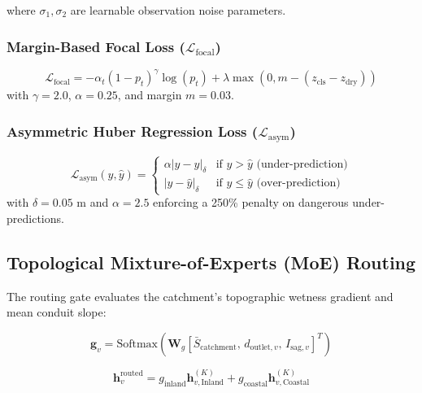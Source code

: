 \documentclass[conference]{IEEEtran}
\begin{document}
where $\sigma_1, \sigma_2$ are learnable observation noise parameters.

\subsubsection{Margin-Based Focal Loss ($\mathcal{L}_{\text{focal}}$)}
\begin{equation}
\mathcal{L}_{\text{focal}} = -\alpha_t (1 - p_t)^\gamma \log(p_t) + \lambda \max(0, m - (z_{\text{cls}} - z_{\text{dry}}))
\end{equation}
with $\gamma = 2.0$, $\alpha = 0.25$, and margin $m = 0.03$.

\subsubsection{Asymmetric Huber Regression Loss ($\mathcal{L}_{\text{asym}}$)}
\begin{equation}
\mathcal{L}_{\text{asym}}(y, \hat{y}) = \begin{cases} \alpha |y - \hat{y}|_\delta & \text{if } y > \hat{y} \text{ (under-prediction)} \\ |y - \hat{y}|_\delta & \text{if } y \le \hat{y} \text{ (over-prediction)} \end{cases}
\end{equation}
with $\delta = 0.05\text{ m}$ and $\alpha = 2.5$ enforcing a 250\% penalty on dangerous under-predictions.

\subsection{Topological Mixture-of-Experts (MoE) Routing}
The routing gate evaluates the catchment's topographic wetness gradient and mean conduit slope:

\begin{equation}
\mathbf{g}_v = \text{Softmax}\left( \mathbf{W}_g \left[ \bar{S}_{\text{catchment}}, \, d_{\text{outlet}, v}, \, I_{\text{sag}, v} \right]^T \right)
\end{equation}

\begin{equation}
\mathbf{h}_v^{\text{routed}} = g_{\text{inland}} \mathbf{h}_{v, \text{Inland}}^{(K)} + g_{\text{coastal}} \mathbf{h}_{v, \text{Coastal}}^{(K)}
\end{equation}
\end{document}
